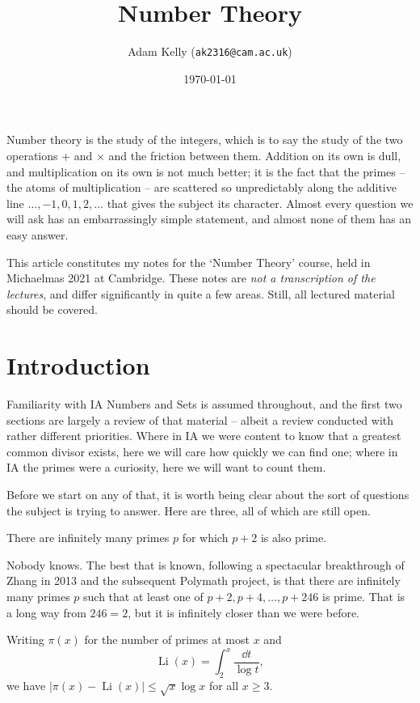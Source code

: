 \documentclass[a4paper]{scrartcl}
\title{Number Theory}
\author{Adam Kelly (\texttt{ak2316@cam.ac.uk})}
\date{\today}
\DeclareMathOperator{\Li}{Li}
\begin{document}
\maketitle

Number theory is the study of the integers, which is to say the study of the two operations $+$ and $\times$ and the friction between them. Addition on its own is dull, and multiplication on its own is not much better; it is the fact that the primes -- the atoms of multiplication -- are scattered so unpredictably along the additive line $\dots, -1, 0, 1, 2, \dots$ that gives the subject its character. Almost every question we will ask has an embarrassingly simple statement, and almost none of them has an easy answer.

This article constitutes my notes for the `Number Theory' course, held in Michaelmas 2021 at Cambridge. These notes are \emph{not a transcription of the lectures}, and differ significantly in quite a few areas. Still, all lectured material should be covered.

\tableofcontents

\section{Introduction}

Familiarity with IA Numbers and Sets is assumed throughout, and the first two sections are largely a review of that material -- albeit a review conducted with rather different priorities. Where in IA we were content to know that a greatest common divisor exists, here we will care how quickly we can find one; where in IA the primes were a curiosity, here we will want to count them.

Before we start on any of that, it is worth being clear about the sort of questions the subject is trying to answer. Here are three, all of which are still open.

\begin{conjecture}
	There are infinitely many primes $p$ for which $p + 2$ is also prime.
\end{conjecture}

Nobody knows. The best that is known, following a spectacular breakthrough of Zhang in 2013 and the subsequent Polymath project, is that there are infinitely many primes $p$ such that at least one of $p+2, p+4, \dots, p+246$ is prime. That is a long way from $246 = 2$, but it is infinitely closer than we were before.

\begin{conjecture}
	Writing $\pi(x)$ for the number of primes at most $x$ and
	$$
	\Li(x) = \int_2^x \frac{\dd t}{\log t},
	$$
	we have $|\pi(x) - \Li(x)| \leq \sqrt{x} \log x$ for all $x \geq 3$.
\end{conjecture}
\end{document}
